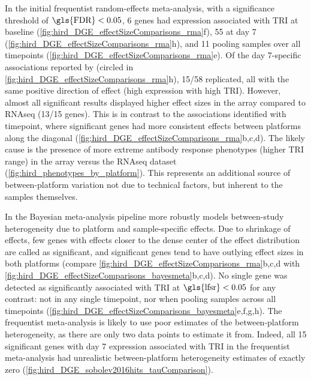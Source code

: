 In the initial frequentist random-effects meta-analysis,
with a significance threshold of $\text{\gls{FDR}} < 0.05$, 6 genes had expression associated with \gls{TRI} at baseline (\cref{fig:hird_DGE_effectSizeComparisons_rma}f), 55 at day 7 (\cref{fig:hird_DGE_effectSizeComparisons_rma}h), and 11 pooling samples over all timepoints (\cref{fig:hird_DGE_effectSizeComparisons_rma}e).
Of the day 7-specific associations reported by \textcite{sobolev2016AdjuvantedInfluenzaH1N1Vaccination} (circled in \cref{fig:hird_DGE_effectSizeComparisons_rma}h), 
15/58 replicated, all with the same positive direction of effect (high expression with high \gls{TRI}).
However, almost all significant results displayed higher effect sizes in the array compared to \gls{RNAseq} (13/15 genes).
This is in contrast to the associations identified with timepoint, where significant genes had more consistent effects between platforms along the diagonal (\cref{fig:hird_DGE_effectSizeComparisons_rma}b,c,d).
The likely cause is the presence of more extreme antibody response phenotypes (higher \gls{TRI} range) in the array versus the \gls{RNAseq} dataset (\cref{fig:hird_phenotypes_by_platform}).
This represents an additional source of between-platform variation not due to technical factors, but inherent to the samples themselves.

In the Bayesian meta-analysis pipeline more robustly models between-study heterogeneity due to platform and sample-specific effects. 
Due to shrinkage of effects, few genes with effects closer to the dense center of the effect distribution are called as significant, and significant genes tend to have outlying effect sizes in both platforms (compare \cref{fig:hird_DGE_effectSizeComparisons_rma}b,c,d with \cref{fig:hird_DGE_effectSizeComparisons_bayesmeta}b,c,d).
No single gene was detected as significantly associated with \gls{TRI} at $\text{\gls{lfsr}} < 0.05$ for any contrast:
not in any single timepoint, nor when pooling samples across all timepoints (\cref{fig:hird_DGE_effectSizeComparisons_bayesmeta}e,f,g,h).
The frequentist meta-analysis is likely to use poor estimates of the between-platform heterogeneity, as there are only two data points to estimate it from.
Indeed, all 15 significant genes with day 7 expression associated with \gls{TRI} in the frequentist meta-analysis
had unrealistic between-platform heterogeneity estimates of exactly zero (\cref{fig:hird_DGE_sobolev2016hits_tauComparison}).

